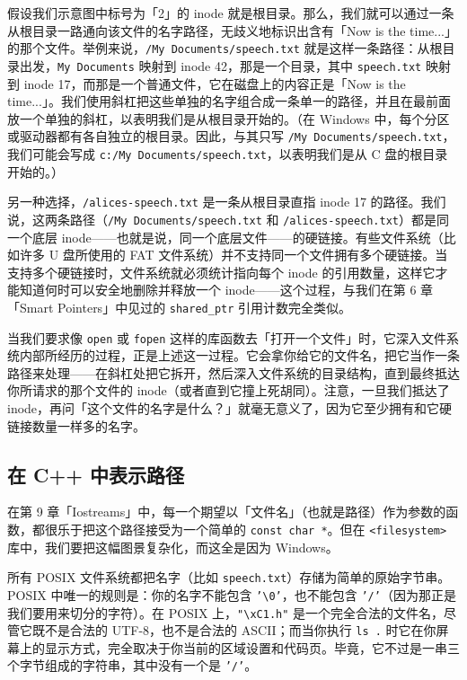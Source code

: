 假设我们示意图中标号为「2」的 inode 就是根目录。那么，我们就可以通过一条从根目录一路通向该文件的名字路径，无歧义地标识出含有「Now is the time...」的那个文件。举例来说，\texttt{/\allowbreak{}My Documents/\allowbreak{}speech.\allowbreak{}txt} 就是这样一条路径：从根目录出发，\texttt{My Documents} 映射到 inode 42，那是一个目录，其中 \texttt{speech.\allowbreak{}txt} 映射到 inode 17，而那是一个普通文件，它在磁盘上的内容正是「Now is the time...」。我们使用斜杠把这些单独的名字组合成一条单一的路径，并且在最前面放一个单独的斜杠，以表明我们是从根目录开始的。（在 Windows 中，每个分区或驱动器都有各自独立的根目录。因此，与其只写 \texttt{/\allowbreak{}My Documents/\allowbreak{}speech.\allowbreak{}txt}，我们可能会写成 \texttt{c:/\allowbreak{}My Documents/\allowbreak{}speech.\allowbreak{}txt}，以表明我们是从 C 盘的根目录开始的。）

另一种选择，\texttt{/\allowbreak{}alices-speech.\allowbreak{}txt} 是一条从根目录直指 inode 17 的路径。我们说，这两条路径（\texttt{/\allowbreak{}My Documents/\allowbreak{}speech.\allowbreak{}txt} 和 \texttt{/\allowbreak{}alices-speech.\allowbreak{}txt}）都是同一个底层 inode——也就是说，同一个底层文件——的硬链接。有些文件系统（比如许多 U 盘所使用的 FAT 文件系统）并不支持同一个文件拥有多个硬链接。当支持多个硬链接时，文件系统就必须统计指向每个 inode 的引用数量，这样它才能知道何时可以安全地删除并释放一个 inode——这个过程，与我们在第 6 章「Smart Pointers」中见过的 \texttt{shared\_\allowbreak{}ptr} 引用计数完全类似。

当我们要求像 \texttt{open} 或 \texttt{fopen} 这样的库函数去「打开一个文件」时，它深入文件系统内部所经历的过程，正是上述这一过程。它会拿你给它的文件名，把它当作一条路径来处理——在斜杠处把它拆开，然后深入文件系统的目录结构，直到最终抵达你所请求的那个文件的 inode（或者直到它撞上死胡同）。注意，一旦我们抵达了 inode，再问「这个文件的名字是什么？」就毫无意义了，因为它至少拥有和它硬链接数量一样多的名字。

\subsection{在 C++ 中表示路径}

在第 9 章「Iostreams」中，每一个期望以「文件名」（也就是路径）作为参数的函数，都很乐于把这个路径接受为一个简单的 \texttt{const char *}。但在 \texttt{<filesystem>\allowbreak{}} 库中，我们要把这幅图景复杂化，而这全是因为 Windows。

所有 POSIX 文件系统都把名字（比如 \texttt{speech.\allowbreak{}txt}）存储为简单的原始字节串。POSIX 中唯一的规则是：你的名字不能包含 \texttt{'\textbackslash 0'}，也不能包含 \texttt{'/\allowbreak{}'}（因为那正是我们要用来切分的字符）。在 POSIX 上，\texttt{"\textbackslash x\allowbreak{}C1.h"} 是一个完全合法的文件名，尽管它既不是合法的 UTF-8，也不是合法的 ASCII；而当你执行 \texttt{ls .} 时它在你屏幕上的显示方式，完全取决于你当前的区域设置和代码页。毕竟，它不过是一串三个字节组成的字符串，其中没有一个是 \texttt{'/\allowbreak{}'}。

